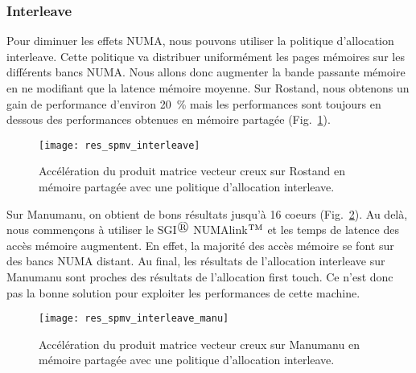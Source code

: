 \subsubsection{Interleave}
Pour diminuer les effets NUMA, nous pouvons utiliser la politique d'allocation interleave.
%
Cette politique va distribuer uniformément les pages mémoires sur les différents bancs NUMA.
%
Nous allons donc augmenter la bande passante mémoire en ne modifiant que la latence mémoire moyenne.
%
Sur Rostand, nous obtenons un gain de performance d'environ 20~\% mais les performances sont toujours en dessous des performances obtenues en mémoire partagée (Fig.~\ref{fig:res_spmv_interleave_rostand}).

\begin{figure}[t!]
  \centering
  \texttt{[image: res\_spmv\_interleave]}
  \caption{Accélération du produit matrice vecteur creux sur Rostand en mémoire partagée avec une politique d'allocation interleave.}
  \label{fig:res_spmv_interleave_rostand}
\end{figure}

Sur Manumanu, on obtient de bons résultats jusqu'à 16 coeurs (Fig.~\ref{fig:res_spmv_interleave_manumanu}).
%
Au delà, nous commençons à utiliser le SGI$^\registered$ NUMAlink$^{\rm TM}$\cite{numalink} et les temps de latence des accès mémoire augmentent.
%
En effet, la majorité des accès mémoire se font sur des bancs NUMA distant.
%
Au final, les résultats de l'allocation interleave sur Manumanu sont proches des résultats de l'allocation first touch.
%
Ce n'est donc pas la bonne solution pour exploiter les performances de cette machine.

\begin{figure}[t!]
  \centering
  \texttt{[image: res\_spmv\_interleave\_manu]}
  \caption{Accélération du produit matrice vecteur creux sur Manumanu en mémoire partagée avec une politique d'allocation interleave.}
  \label{fig:res_spmv_interleave_manumanu}
\end{figure}
